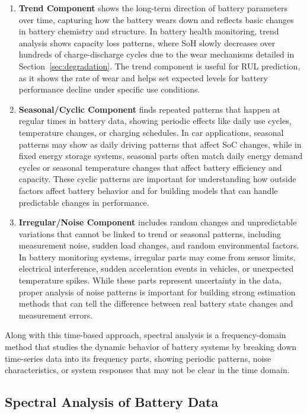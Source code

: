 \begin{enumerate}
    \item \textbf{Trend Component} shows the long-term direction of battery parameters over time, capturing how the battery wears down and reflects basic changes in battery chemistry and structure. In battery health monitoring, trend analysis shows capacity loss patterns, where SoH slowly decreases over hundreds of charge-discharge cycles due to the wear mechanisms detailed in Section~\ref{sec:degradation}. The trend component is useful for RUL prediction, as it shows the rate of wear and helps set expected levels for battery performance decline under specific use conditions.
   \item  \textbf{Seasonal/Cyclic Component} finds repeated patterns that happen at regular times in battery data, showing periodic effects like daily use cycles, temperature changes, or charging schedules. In car applications, seasonal patterns may show as daily driving patterns that affect SoC changes, while in fixed energy storage systems, seasonal parts often match daily energy demand cycles or seasonal temperature changes that affect battery efficiency and capacity. These cyclic patterns are important for understanding how outside factors affect battery behavior and for building models that can handle predictable changes in performance.
   \item \textbf{Irregular/Noise Component} includes random changes and unpredictable variations that cannot be linked to trend or seasonal patterns, including measurement noise, sudden load changes, and random environmental factors. In battery monitoring systems, irregular parts may come from sensor limits, electrical interference, sudden acceleration events in vehicles, or unexpected temperature spikes. While these parts represent uncertainty in the data, proper analysis of noise patterns is important for building strong estimation methods that can tell the difference between real battery state changes and measurement errors.
\end{enumerate}



Along with this time-based approach, spectral analysis is a frequency-domain method that studies the dynamic behavior of battery systems by breaking down time-series data into its frequency parts, showing periodic patterns, noise characteristics, or system responses that may not be clear in the time domain. 

\subsection{Spectral Analysis of Battery Data}

